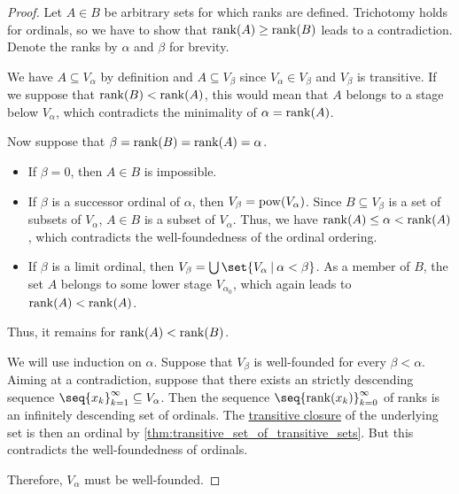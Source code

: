 \begin{proof}
   Let \( A \in B \) be arbitrary sets for which ranks are defined. Trichotomy holds for ordinals, so we have to show that \( \operatorname{rank}(A) \geq \operatorname{rank}(B) \) leads to a contradiction. Denote the ranks by \( \alpha \) and \( \beta \) for brevity.

  We have \( A \subseteq V_\alpha \) by definition and \( A \subseteq V_\beta \) since \( V_\alpha \in V_\beta \) and \( V_\beta \) is transitive. If we suppose that \( \operatorname{rank}(B) < \operatorname{rank}(A) \), this would mean that \( A \) belongs to a stage below \( V_\alpha \), which contradicts the minimality of \( \alpha = \operatorname{rank}(A) \).

  Now suppose that \( \beta = \operatorname{rank}(B) = \operatorname{rank}(A) = \alpha \).
  \begin{itemize}
    \item If \( \beta = 0 \), then \( A \in B \) is impossible.

    \item If \( \beta \) is a successor ordinal of \( \alpha \), then \( V_\beta = \operatorname{pow}(V_\alpha) \). Since \( B \subseteq V_\beta \) is a set of subsets of \( V_\alpha \), \( A \in B \) is a subset of \( V_\alpha \). Thus, we have \( \operatorname{rank}(A) \leq \alpha < \operatorname{rank}(A) \), which contradicts the well-foundedness of the ordinal ordering.

    \item If \( \beta \) is a limit ordinal, then \( V_\beta = \bigcup\set{ V_\alpha \given \alpha < \beta } \). As a member of \( B \), the set \( A \) belongs to some lower stage \( V_{\alpha_0} \), which again leads to \( \operatorname{rank}(A) < \operatorname{rank}(A) \).
  \end{itemize}

  Thus, it remains for \( \operatorname{rank}(A) < \operatorname{rank}(B) \).

   We will use induction on \( \alpha \). Suppose that \( V_\beta \) is well-founded for every \( \beta < \alpha \). Aiming at a contradiction, suppose that there exists an strictly descending sequence \( \seq{ x_k }_{k=1}^\infty \subseteq V_\alpha \). Then the sequence \( \seq{ \rank(x_k) }_{k=0}^\infty \) of ranks is an infinitely descending set of ordinals. The \hyperref[def:transitive_closure_of_a_set]{transitive closure} of the underlying set is then an ordinal by \cref{thm:transitive_set_of_transitive_sets}. But this contradicts the well-foundedness of ordinals.

  Therefore, \( V_\alpha \) must be well-founded.


\end{proof}
